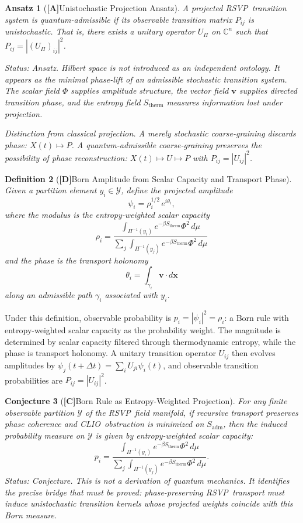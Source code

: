 \documentclass[12pt,a4paper]{article}
\newcommand{\claimD}{\textbf{[D]}\;}
\newcommand{\claimA}{\textbf{[A]}\;}
\newcommand{\claimC}{\textbf{[C]}\;}
\newtheorem{defn}{Definition}[section]
\newtheorem{appansatz}[defn]{Ansatz}
\newtheorem{appconj}[defn]{Conjecture}
\newcommand{\RSVP}{\textrm{RSVP}}
\newcommand{\CLIO}{\textrm{CLIO}}
\begin{document}
\begin{appansatz}[\claimA Unistochastic Projection Ansatz]
A projected \RSVP\ transition system is \emph{quantum-admissible} if its
observable transition matrix $P_{ij}$ is unistochastic. That is, there exists
a unitary operator $U_\Pi$ on $\mathbb{C}^n$ such that $P_{ij}=|(U_\Pi)_{ij}|^2$.

\emph{Status: Ansatz.} Hilbert space is not introduced as an independent
ontology. It appears as the minimal phase-lift of an admissible stochastic
transition system. The scalar field $\Phi$ supplies amplitude structure, the
vector field $\mathbf{v}$ supplies directed transition phase, and the entropy
field $S_\mathrm{therm}$ measures information lost under projection.

\emph{Distinction from classical projection.} A merely stochastic coarse-graining
discards phase: $X(t)\mapsto P$. A quantum-admissible coarse-graining preserves
the possibility of phase reconstruction: $X(t)\mapsto U\mapsto P$ with
$P_{ij}=|U_{ij}|^2$.
\end{appansatz}

\begin{defn}[\claimD Born Amplitude from Scalar Capacity and Transport Phase]
Given a partition element $y_i\in\mathcal{Y}$, define the projected amplitude
\[
\psi_i
= \rho_i^{1/2}\,e^{i\theta_i},
\]
where the modulus is the entropy-weighted scalar capacity
\[
\rho_i
= \frac{\displaystyle\int_{\Pi^{-1}(y_i)} e^{-\beta S_\mathrm{therm}}\Phi^2\,d\mu}
         {\displaystyle\sum_j\int_{\Pi^{-1}(y_j)} e^{-\beta S_\mathrm{therm}}\Phi^2\,d\mu}
\]
and the phase is the transport holonomy
\[
\theta_i = \int_{\gamma_i}\mathbf{v}\cdot d\mathbf{x}
\]
along an admissible path $\gamma_i$ associated with $y_i$.
\end{defn}

Under this definition, observable probability is $p_i=|\psi_i|^2=\rho_i$: a
Born rule with entropy-weighted scalar capacity as the probability weight. The
magnitude is determined by scalar capacity filtered through thermodynamic
entropy, while the phase is transport holonomy. A unitary transition operator
$U_{ij}$ then evolves amplitudes by $\psi_j(t+\Delta t)=\sum_i U_{ji}\psi_i(t)$,
and observable transition probabilities are $P_{ij}=|U_{ij}|^2$.

\begin{appconj}[\claimC Born Rule as Entropy-Weighted Projection]
For any finite observable partition $\mathcal{Y}$ of the \RSVP\ field manifold,
if recursive transport preserves phase coherence and \CLIO\ obstruction is
minimized on $S_\mathrm{adm}$, then the induced probability measure on
$\mathcal{Y}$ is given by entropy-weighted scalar capacity:
\[
p_i
= \frac{\displaystyle\int_{\Pi^{-1}(y_i)} e^{-\beta S_\mathrm{therm}}\Phi^2\,d\mu}
         {\displaystyle\sum_j\int_{\Pi^{-1}(y_j)} e^{-\beta S_\mathrm{therm}}\Phi^2\,d\mu}.
\]
\emph{Status: Conjecture.} This is not a derivation of quantum mechanics. It
identifies the precise bridge that must be proved: phase-preserving \RSVP\
transport must induce unistochastic transition kernels whose projected weights
coincide with this Born measure.
\end{appconj}
\end{document}
